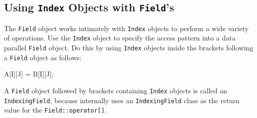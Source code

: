 \subsection{Using \texttt{Index} Objects with \texttt{Field}'s} \label{sec:index_fields}

The \texttt{Field} object works intimately with \texttt{Index} objects to perform a wide variety of operations. Use the \texttt{Index} object to specify the access pattern into a data parallel \texttt{Field} object. Do this by using \texttt{Index} objects inside the brackets following a \texttt{Field} object as follows:
\begin{smallcode}
A[I][J] = B[I][J];
\end{smallcode}
A \texttt{Field} object followed by brackets containing \texttt{Index} objects is called an \texttt{IndexingField}, because \ippl internally uses an \texttt{IndexingField} class as the return value for the \texttt{Field::operator[]}.

